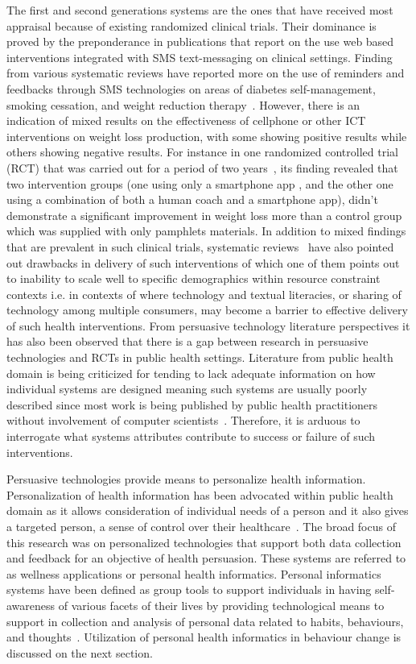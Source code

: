 The first and second generations systems are the ones that have received most appraisal because of existing randomized clinical trials. Their dominance is proved by the preponderance in publications that report on the use web based interventions integrated with SMS text-messaging on clinical settings. Finding from various systematic reviews have reported more on the use of reminders and feedbacks through SMS technologies on areas of diabetes self-management, smoking cessation, and weight reduction therapy~\citep{cole2010text,fjeldsoe2009behavior,krishna2009healthcare}. However, there is an indication of mixed results on the effectiveness of cellphone or other ICT interventions on weight loss production, with some showing positive results while others showing negative results. For instance in one randomized controlled trial (RCT) that was carried out for a period of two years~\citep{svetkey2015cell}, its finding revealed that two intervention groups (one using only a smartphone app , and the other one using a combination of both a human coach and a smartphone app), didn't demonstrate a significant improvement in weight loss more than a control group which was supplied with only pamphlets materials. In addition to mixed findings that are prevalent in such clinical trials, systematic reviews~\citep{cole2010text,kaplan2006can} have also pointed out drawbacks in delivery of such interventions of which one of them points out to inability to scale well to specific demographics within resource constraint contexts i.e. in contexts of where technology and textual literacies, or sharing of technology among multiple consumers, may become a barrier to effective delivery of such health interventions. From persuasive technology literature perspectives it has also been observed that there is a gap between research in persuasive technologies and RCTs in public health settings. Literature from public health domain is being criticized for tending to lack adequate information on how individual systems are designed meaning such systems are usually poorly described since most work is being published by public health practitioners without involvement of computer scientists~\citep{Oinas-Kukkonen:foundation}. Therefore, it is arduous to interrogate what systems attributes contribute to success or failure of such interventions. 

Persuasive technologies provide means to personalize health information. Personalization of health information has been advocated within public health domain as it allows consideration of individual needs of a person and it also gives a targeted person, a  sense of control over their healthcare~\citep{mccallum2012gamification}. The broad focus of this research was on  personalized technologies that support both  data collection and feedback for an objective of health persuasion. These systems are referred to as wellness applications or personal health informatics. Personal informatics systems have been defined as group tools to support individuals in having self-awareness of various facets of their lives by providing technological means to support in collection and analysis of personal data related to habits, behaviours, and thoughts~\citep{li2011personal,li2012personal}. Utilization of personal health informatics in behaviour change is discussed on the next section. 
